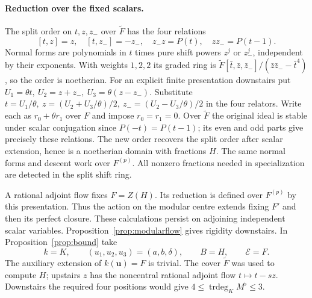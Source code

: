 \documentclass[11pt,a4paper]{article}
\renewcommand{\le}{\leqslant}\renewcommand{\ge}{\geqslant}
\theoremstyle{definition}
\begin{document}
\paragraph{Reduction over the fixed scalars.}
The split order on \(t,z,z_-\) over \(\widetilde F\) has the four relations
\[
 [t,z]=z,\quad [t,z_-]=-z_-,\quad z_-z=P(t),\quad zz_-=P(t-1).
\]
Normal forms are polynomials in \(t\) times pure shift powers \(z^j\) or \(z_-^j\), independent by their exponents. With weights \(1,2,2\) its graded ring is \(\widetilde F[\bar t,\bar z,\bar z_-]/(\bar z\bar z_- -\bar t^4)\), so the order is noetherian. For an explicit finite presentation downstairs put
\(U_1=\theta t,\ U_2=z+z_-,\ U_3=\theta(z-z_-)\).
Substitute \(t=U_1/\theta,\ z=(U_2+U_3/\theta)/2,\ z_-=(U_2-U_3/\theta)/2\) in the four relators. Write each as \(r_0+\theta r_1\) over \(F\) and impose \(r_0=r_1=0\). Over \(\widetilde F\) the original ideal is stable under scalar conjugation since \(P(-t)=P(t-1)\); its even and odd parts give precisely these relations. The new order recovers the split order after scalar extension, hence is a noetherian domain with fractions \(H\). The same normal forms and descent work over \(F^{(p)}\). All nonzero fractions needed in specialization are detected in the split shift ring.

A rational adjoint flow fixes \(F=Z(H)\). Its reduction is defined over \(F^{(p)}\) by this presentation. Thus the action on the modular centre extends fixing \(F'\) and then its perfect closure. These calculations persist on adjoining independent scalar variables. Proposition~\ref{prop:modularflow} gives rigidity downstairs. In Proposition~\ref{prop:bound} take
\[
 k=K,\qquad (u_1,u_2,u_3)=(a,b,\delta),\qquad B=H,\qquad \mathcal E=F.
\]
The auxiliary extension of \(k(\mathbf u)=F\) is trivial. The cover \(\widetilde F\) was used to compute \(H\); upstairs \(z\) has the noncentral rational adjoint flow \(t\mapsto t-sz\). Downstairs the required four positions would give \(4\le\operatorname{trdeg}_K M^\flat\le3\).
\end{document}
